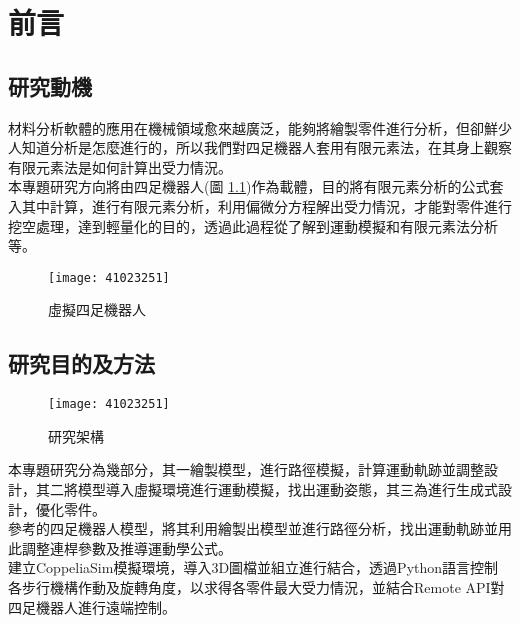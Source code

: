 \chapter{前言}
\renewcommand{\baselinestretch}{10.0} %
\setcounter{page}{1}  %
\fontsize{14pt}{2.5pt}\sectionef

\section{研究動機}
材料分析軟體的應用在機械領域愈來越廣泛，能夠將繪製零件進行分析，但卻鮮少人知道分析是怎麼進行的，所以我們對四足機器人套用有限元素法，在其身上觀察有限元素法是如何計算出受力情況。\\

本專題研究方向將由四足機器人(圖 \ref{四足機器狗(PLA)})作為載體，目的將有限元素分析的公式套入其中計算，進行有限元素分析，利用偏微分方程解出受力情況，才能對零件進行挖空處理，達到輕量化的目的，透過此過程從了解到運動模擬和有限元素法分析等。\\

\begin{figure}[hbt!]
\center
\texttt{[image: 41023251]}
\caption{\Large 虛擬四足機器人}\label{四足機器狗(PLA)}
\end{figure}
\newpage
\section{研究目的及方法}
\begin{figure}[hbt!]
\begin{center}
\texttt{[image: 41023251]}
\caption{\Large 研究架構}\label{研究架構}
\end{center}
\end{figure}
本專題研究分為幾部分，其一繪製模型，進行路徑模擬，計算運動軌跡並調整設計，其二將模型導入虛擬環境進行運動模擬，找出運動姿態，其三為進行生成式設計，優化零件。\\

參考的四足機器人模型，將其利用繪製出模型並進行路徑分析，找出運動軌跡並用此調整連桿參數及推導運動學公式。\\

建立CoppeliaSim模擬環境，導入3D圖檔並組立進行結合，透過Python語言控制各步行機構作動及旋轉角度，以求得各零件最大受力情況，並結合Remote API對四足機器人進行遠端控制。\\

